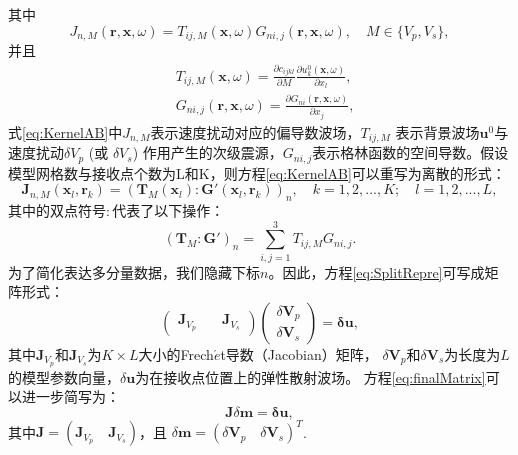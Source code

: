 其中
\begin{equation}
        J_{n,M}(\mathbf{r,x},\omega)=
        T_{ij,M}(\mathbf{x},\omega)G_{ni,j}(\mathbf{r,x},\omega), \quad M\in\{V_p,V_s\},
\label{eq:KernelAB}
\end{equation}
并且
\begin{equation}
\begin{split}
                &T_{ij,M}(\mathbf{x},\omega)=\frac{\partial c_{ijkl}}{\partial M}\frac{\partial
                        u^0_{k}(\mathbf{x},\omega)}{\partial x_l},\\ 
                        &G_{ni,j}(\mathbf{r,x},\omega)=\frac{\partial
                                G_{ni}(\mathbf{r},\mathbf{x},\omega)}{\partial x_j},
\end{split}
\label{eq:traction}
\end{equation}
式\ref{eq:KernelAB}中$J_{n,M}$表示速度扰动对应的偏导数波场\cite[]{pratt1998gauss}，$T_{ij,M}$
表示背景波场$\mathbf{u}^0$与速度扰动$\delta V_p$ (或 $\delta V_s$)
作用产生的次级震源，$G_{ni,j}$表示格林函数的空间导数。假设模型网格数与接收点个数为L和K，则方程\eqref{eq:KernelAB}可以重写为离散的形式：
\begin{equation}
        \mathbf{J}_{n,M}(\mathbf{x}_l,\mathbf{r}_k)=
        (\mathbf{T}_M(\mathbf{x}_l):\mathbf{G}'(\mathbf{x}_l,\mathbf{r}_k))_n,\quad
        k=1,2,...,K;\quad l=1, 2,...,L,
        \label{eq:EquivFre}
\end{equation}
其中的双点符号$:$代表了以下操作：
\begin{equation}
    (\mathbf{T}_M:\mathbf{G}')_{n}=\sum_{i,j=1}^{3}T_{ij,M}G_{ni,j}.
    \label{eq:contraction}
\end{equation}
为了简化表达多分量数据，我们隐藏下标$n$。因此，方程\eqref{eq:SplitRepre}可写成矩阵形式：
\begin{equation}
            \begin{pmatrix}
                        \mathbf{J}_{V_p}&\quad\mathbf{J}_{V_s}
    \end{pmatrix}
    \begin{pmatrix}
       \delta  \mathbf{V}_p\\
       \delta \mathbf{V}_s
    \end{pmatrix}
    =
        \mathbf{\delta u},
        \label{eq:finalMatrix}
\end{equation}
其中$\mathbf{J}_{V_p}$和$\mathbf{J}_{V_s}$为$K\times L$大小的Frech{$\acute{e}$}t导数（Jacobian）矩阵，
$\delta \mathbf{V}_p$和$\delta \mathbf{V}_s$为长度为$L$的模型参数向量，$\delta \mathbf{u}$为在接收点位置上的弹性散射波场。
方程\eqref{eq:finalMatrix}可以进一步简写为：
\begin{equation}
        \mathbf{J}\delta \mathbf{m}
    =
        \mathbf{\delta u},
        \label{eq:finalMatrixshort}
\end{equation}
其中$\mathbf{J}=(\mathbf{J}_{V_p}\quad\mathbf{J}_{V_s})$，且 
$\delta \mathbf{m}=(\delta\mathbf{V}_p \quad \delta\mathbf{V}_s)^T$.

